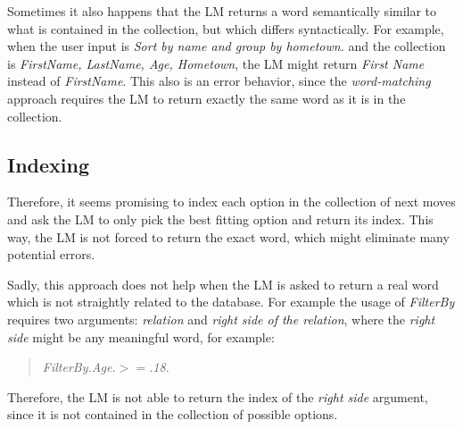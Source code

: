 \documentclass[11pt]{article}
\begin{document}
Sometimes it also happens that the LM returns a word semantically similar to what is contained in the collection, but which differs syntactically. For example, when the user input is \textit{Sort by name and group by hometown.} and the collection is \textit{FirstName, LastName, Age, Hometown}, the LM might return \textit{First Name} instead of \textit{FirstName}. This also is an error behavior, since the \textit{word-matching} approach requires the LM to return exactly the same word as it is in the collection.

\subsection{Indexing}

Therefore, it seems promising to index each option in the collection of next moves and ask the LM to only pick the best fitting option and return its index. This way, the LM is not forced to return the exact word, which might eliminate many potential errors. 

Sadly, this approach does not help when the LM is asked to return a real word which is not straightly related to the database. For example the usage of \textit{FilterBy} requires two arguments: \textit{relation} and \textit{right side of the relation}, where the \textit{right side} might be any meaningful word, for example:
\begin{quotation}
    \textit{FilterBy.Age.\begin{math}>=\end{math}.18.}
\end{quotation}
Therefore, the LM is not able to return the index of the \textit{right side} argument, since it is not contained in the collection of possible options.

\pagebreak
\end{document}
